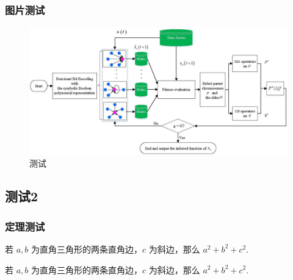 \subsubsection{图片测试}
\begin{figure}[H]
	\centering
	\includegraphics[width=0.9\linewidth]{image/GAPORE}
	\caption{测试}
	\label{fig:gapore}
\end{figure}




\subsection{测试2}

\subsubsection{定理测试}
\begin{theorem}[勾股定理]
	若 $a,b$ 为直角三角形的两条直角边，$c$ 为斜边，那么 $a^2 + b^2 + c^2.$
\end{theorem}

\begin{definition}[勾股定理]
	若 $a,b$ 为直角三角形的两条直角边，$c$ 为斜边，那么 $a^2 + b^2 + c^2.$
\end{definition}


